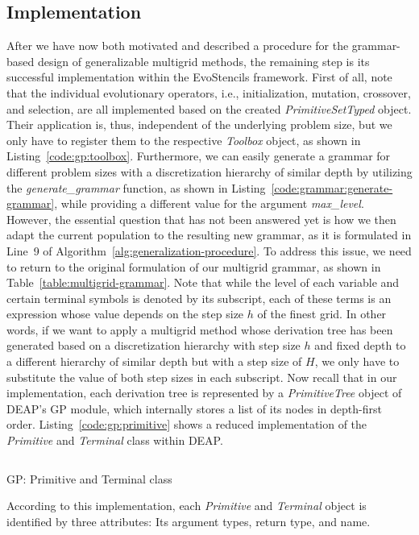 \subsection{Implementation}
After we have now both motivated and described a procedure for the grammar-based design of generalizable multigrid methods, the remaining step is its successful implementation within the EvoStencils framework.
First of all, note that the individual evolutionary operators, i.e., initialization, mutation, crossover, and selection, are all implemented based on the created \emph{PrimitiveSetTyped} object. 
Their application is, thus, independent of the underlying problem size, but we only have to register them to the respective \emph{Toolbox} object, as shown in Listing~\ref{code:gp:toolbox}.
Furthermore, we can easily generate a grammar for different problem sizes with a discretization hierarchy of similar depth by utilizing the \emph{generate\_grammar} function, as shown in Listing~\ref{code:grammar:generate-grammar}, while providing a different value for the argument \emph{max\_level}.
However, the essential question that has not been answered yet is how we then adapt the current population to the resulting new grammar, as it is formulated in Line~9 of Algorithm~\ref{alg:generalization-procedure}.
To address this issue, we need to return to the original formulation of our multigrid grammar, as shown in Table~\ref{table:multigrid-grammar}.
Note that while the level of each variable and certain terminal symbols is denoted by its subscript, each of these terms is an expression whose value depends on the step size $h$ of the finest grid.
In other words, if we want to apply a multigrid method whose derivation tree has been generated based on a discretization hierarchy with step size $h$ and fixed depth to a different hierarchy of similar depth but with a step size of $H$, we only have to substitute the value of both step sizes in each subscript.
Now recall that in our implementation, each derivation tree is represented by a \emph{PrimitiveTree} object of DEAP's GP module, which internally stores a list of its nodes in depth-first order.
Listing~\ref{code:gp:primitive} shows a reduced implementation of the \emph{Primitive} and \emph{Terminal} class within DEAP.
\begin{listing}
	\inputminted{python}{evostencils/gp/primitive.py}
	\caption{GP: Primitive and Terminal class}
	\label{code:gp:primitive}
\end{listing}
According to this implementation, each \emph{Primitive} and \emph{Terminal} object is identified by three attributes: Its argument types, return type, and name.
